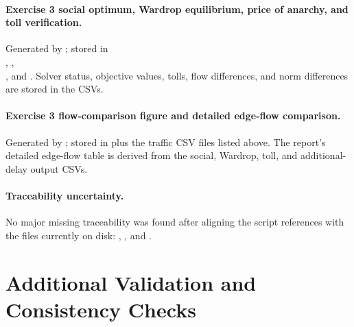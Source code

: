 \documentclass[11pt,a4paper]{article}
\begin{document}
\paragraph{Exercise 3 social optimum, Wardrop equilibrium, price of anarchy, and toll verification.}
Generated by ; stored in \\ , , \\ , and . Solver status, objective values, tolls, flow differences, and norm differences are stored in the CSVs.

\paragraph{Exercise 3 flow-comparison figure and detailed edge-flow comparison.}
Generated by ; stored in  plus the traffic CSV files listed above. The report's detailed edge-flow table is derived from the social, Wardrop, toll, and additional-delay output CSVs.

\paragraph{Traceability uncertainty.}
No major missing traceability was found after aligning the script references with the files currently on disk: , , and .

\section{Additional Validation and Consistency Checks}
\end{document}
